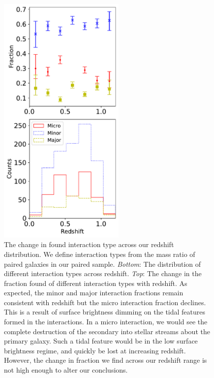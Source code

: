 \begin{figure}
\centering
\includegraphics[width=0.55\textwidth]{Chapter3/figures/mass-ratio-limitation.pdf}
\caption[The change in found interaction type across our redshift distribution.]{The change in found interaction type across our redshift distribution. We define interaction types from the mass ratio of paired galaxies in our paired sample. \textit{Bottom}: The distribution of different interaction types across redshift. \textit{Top}: The change in the fraction found of different interaction types with redshift. As expected, the minor and major interaction fractions remain consistent with redshift but the micro interaction fraction declines. This is a result of surface brightness dimming on the tidal features formed in the interactions. In a micro interaction, we would see the complete destruction of the secondary into stellar streams about the primary galaxy. Such a tidal feature would be in the low surface brightness regime, and quickly be lost at increasing redshift. However, the change in fraction we find across our redshift range is not high enough to alter our conclusions.}
\label{fig:mass-ratio-limitation}
\end{figure}

